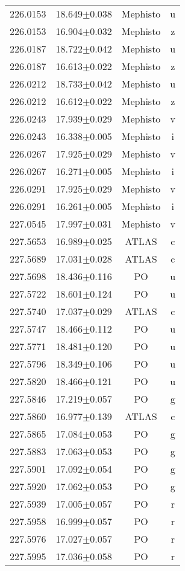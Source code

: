 \begin{table}
\begin{tabular}{cccc}
226.0153 & 18.649$\pm$0.038 & Mephisto & u \\
226.0153 & 16.904$\pm$0.032 & Mephisto & z \\
226.0187 & 18.722$\pm$0.042 & Mephisto & u \\
226.0187 & 16.613$\pm$0.022 & Mephisto & z \\
226.0212 & 18.733$\pm$0.042 & Mephisto & u \\
226.0212 & 16.612$\pm$0.022 & Mephisto & z \\
226.0243 & 17.939$\pm$0.029 & Mephisto & v \\
226.0243 & 16.338$\pm$0.005 & Mephisto & i \\
226.0267 & 17.925$\pm$0.029 & Mephisto & v \\
226.0267 & 16.271$\pm$0.005 & Mephisto & i \\
226.0291 & 17.925$\pm$0.029 & Mephisto & v \\
226.0291 & 16.261$\pm$0.005 & Mephisto & i \\
227.0545 & 17.997$\pm$0.031 & Mephisto & v \\
227.5653 & 16.989$\pm$0.025 & ATLAS & c \\
227.5689 & 17.031$\pm$0.028 & ATLAS & c \\
227.5698 & 18.436$\pm$0.116 & PO & u \\
227.5722 & 18.601$\pm$0.124 & PO & u \\
227.5740 & 17.037$\pm$0.029 & ATLAS & c \\
227.5747 & 18.466$\pm$0.112 & PO & u \\
227.5771 & 18.481$\pm$0.120 & PO & u \\
227.5796 & 18.349$\pm$0.106 & PO & u \\
227.5820 & 18.466$\pm$0.121 & PO & u \\
227.5846 & 17.219$\pm$0.057 & PO & g \\
227.5860 & 16.977$\pm$0.139 & ATLAS & c \\
227.5865 & 17.084$\pm$0.053 & PO & g \\
227.5883 & 17.063$\pm$0.053 & PO & g \\
227.5901 & 17.092$\pm$0.054 & PO & g \\
227.5920 & 17.062$\pm$0.053 & PO & g \\
227.5939 & 17.005$\pm$0.057 & PO & r \\
227.5958 & 16.999$\pm$0.057 & PO & r \\
227.5976 & 17.027$\pm$0.057 & PO & r \\
227.5995 & 17.036$\pm$0.058 & PO & r \\

\end{tabular}
\end{table}
